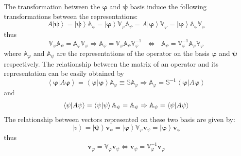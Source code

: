 \documentclass[aps,preprint]{revtex4}
\begin{document}
The transformation between the $\mathbf{\varphi }$ and $\mathbf{\psi }$
basis induce the following transformations between the representations: 
\begin{equation}
A\left\vert \mathbf{\psi }\right\rangle =\left\vert \mathbf{\psi }%
\right\rangle \mathbb{A}_{\psi }=\left\vert \mathbf{\varphi }\right\rangle 
\mathbb{V}_{\varphi }\mathbb{A}_{\psi }=A\left\vert \mathbf{\varphi }%
\right\rangle \mathbb{V}_{\varphi }=\left\vert \mathbf{\varphi }%
\right\rangle \mathbb{A}_{\varphi }\mathbb{V}_{\varphi }
\end{equation}%
thus 
\begin{equation}
\mathbb{V}_{\varphi }\mathbb{A}_{\psi }=\mathbb{A}_{\varphi }\mathbb{V}%
_{\varphi }\Rightarrow \mathbb{A}_{\varphi }=\mathbb{V}_{\varphi }\mathbb{A}%
_{\psi }\mathbb{V}_{\varphi }^{-1}\text{ }\Longleftrightarrow \text{ }%
\mathbb{A}_{\psi }=\mathbb{V}_{\varphi }^{-1}\mathbb{A}_{\varphi }\mathbb{V}%
_{\varphi }
\end{equation}%
where $\mathbb{A}_{\varphi }$ and $\mathbb{A}_{\psi }$ are the
representations of the operator on the basis $\mathbf{\varphi }$ and $%
\mathbf{\psi }$ respectively. The relationship between the matrix of an
operator and its representation can be easily obtained by%
\begin{equation}
\left\langle \mathbf{\varphi }|A\mathbf{\varphi }\right\rangle =\left\langle 
\mathbf{\varphi }|\mathbf{\varphi }\right\rangle \mathbb{A}_{\varphi }\equiv 
\mathbb{SA}_{\varphi }\Rightarrow \mathbb{A}_{\varphi }=\mathbb{S}%
^{-1}\left\langle \mathbf{\varphi }|A\mathbf{\varphi }\right\rangle
\end{equation}%
and 
\begin{equation}
\left\langle \mathbf{\psi }|A\mathbf{\psi }\right\rangle =\left\langle 
\mathbf{\psi }|\mathbf{\psi }\right\rangle \mathbb{A}_{\psi }=\mathbb{A}%
_{\psi }\Rightarrow \mathbb{A}_{\psi }=\left\langle \mathbf{\psi }|A\mathbf{%
\psi }\right\rangle
\end{equation}%
The relationship between vectors represented on these two basis are given by:%
\begin{equation}
\left\vert v\right\rangle =\left\vert \mathbf{\psi }\right\rangle \mathbf{v}%
_{\psi }=\left\vert \mathbf{\varphi }\right\rangle \mathbb{V}_{\varphi }%
\mathbf{v}_{\psi }=\left\vert \mathbf{\varphi }\right\rangle \mathbf{v}%
_{\varphi }
\end{equation}%
thus 
\begin{equation}
\mathbf{v}_{\varphi }=\mathbb{V}_{\varphi }\mathbf{v}_{\psi
}\Longleftrightarrow \mathbf{v}_{\psi }=\mathbb{V}_{\varphi }^{-1}\mathbf{v}%
_{\varphi }
\end{equation}%
\end{document}
